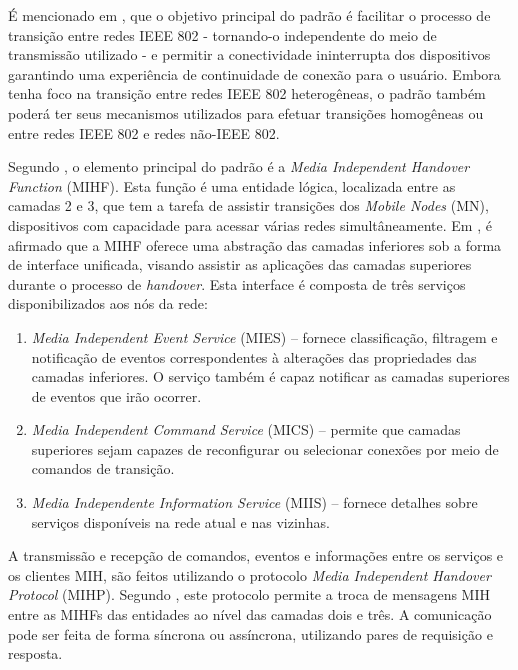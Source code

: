 \documentclass[12pt]{article}
\begin{document}
É mencionado em \cite{ieee:2008:80221}, que o objetivo principal do padrão é 
facilitar o processo de transição entre redes IEEE 802 - tornando-o 
independente do meio de transmissão utilizado - e permitir a conectividade 
ininterrupta dos dispositivos garantindo uma experiência de continuidade de 
conexão para o usuário.  Embora tenha foco na transição entre redes IEEE 802 
heterogêneas, o padrão também poderá ter seus mecanismos utilizados para 
efetuar transições homogêneas ou entre redes IEEE 802 e redes não-IEEE 802.

Segundo \cite{piri:2009}, o elemento principal do padrão é a \textit{Media 
Independent Handover Function} (MIHF). Esta função é uma entidade lógica, 
localizada entre as camadas 2 e 3, que tem a tarefa de assistir transições dos 
\textit{Mobile Nodes} (MN), dispositivos com capacidade para acessar várias 
redes simultâneamente. Em \cite{kimhun:2010}, é afirmado que a MIHF oferece 
uma abstração das camadas inferiores sob a forma de interface unificada, 
visando assistir as aplicações das camadas superiores durante o processo de 
\textit{handover}. Esta interface é composta de três serviços disponibilizados 
aos nós da rede:

\begin{enumerate}

	\item \textit{Media Independent Event Service} (MIES) -- fornece 
	classificação, filtragem e notificação de eventos correspondentes à 
	alterações das propriedades das camadas inferiores. O serviço também é 
	capaz notificar as camadas superiores de eventos que irão ocorrer.

	\item \textit{Media Independent Command Service} (MICS) -- permite que 
	camadas superiores sejam capazes de reconfigurar ou selecionar 
	conexões por meio de comandos de transição.

	\item \textit{Media Independente Information Service} (MIIS) --  
	fornece detalhes sobre serviços disponíveis na rede atual e nas 
	vizinhas.
	
\end{enumerate}

A transmissão e recepção de comandos, eventos e informações entre os serviços 
e os clientes MIH, são feitos utilizando o protocolo \textit{Media Independent 
Handover Protocol} (MIHP). Segundo \cite{ieee:2008:80221}, este protocolo 
permite a troca de mensagens MIH entre as MIHFs das entidades ao nível das 
camadas dois e três. A comunicação pode ser feita de forma síncrona ou 
assíncrona, utilizando pares de requisição e resposta.
\end{document}
